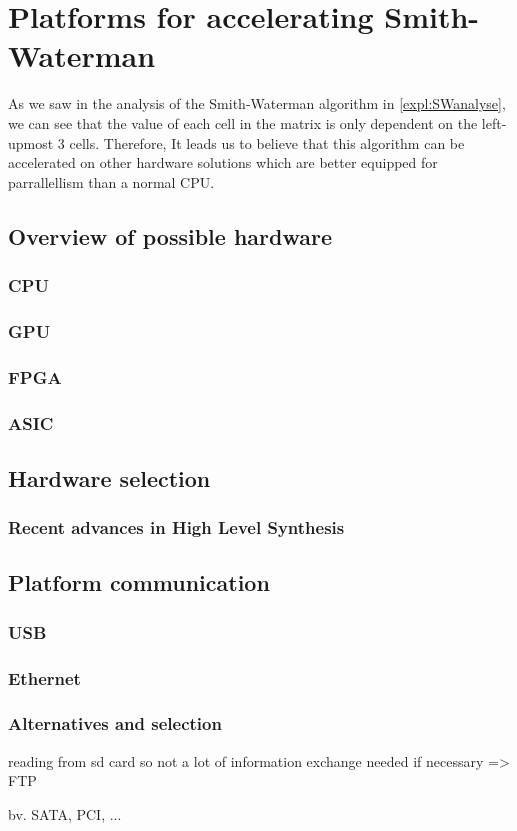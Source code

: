 
\chapter{Platforms for accelerating Smith-Waterman}
\label{ch:Platforms}

As we saw in the analysis of the Smith-Waterman algorithm in \ref{expl:SWanalyse}, we can see that the value of each cell in the matrix is only dependent on the left-upmost 3 cells. Therefore, It leads us to believe that this algorithm can be accelerated on other hardware solutions which are better equipped for parrallellism than a normal CPU.

\section{Overview of possible hardware}

\subsection{CPU}
\subsection{GPU}
\subsection{FPGA}
\subsection{ASIC}

\section{Hardware selection}

\subsection{Recent advances in High Level Synthesis}

\section{Platform communication}

\subsection{USB}
\subsection{Ethernet}
\subsection{Alternatives and selection}

reading from sd card so not a lot of information exchange needed
if necessary => FTP

bv. SATA, PCI, ...

